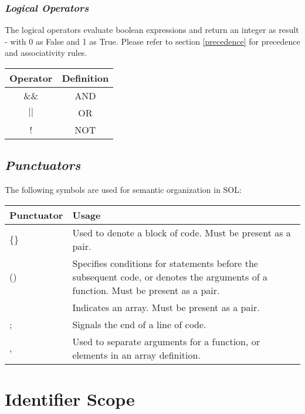 \documentclass[letterpaper,12pt]{article}
\begin{document}
        \subsubsection{\textit{Logical Operators}}
        The logical operators evaluate boolean expressions and return an integer as result - with 0 as False and 1 as True. Please refer to section \ref{precedence} for precedence and associativity rules.
	        \begin{center}
	        	\begin{tabular}{ |c|c| }
	        		\hline
	        		\textbf{Operator} & \textbf{Definition}\\
	        		\hline
	        		\&\&  & AND\\
	        		$||$  & OR\\
	        		!  & NOT\\
	        		\hline
	        	\end{tabular}
	        \end{center}

	\subsection{\textit{Punctuators}}
	The following symbols are used for semantic organization in SOL:
	     \begin{center}
	     	\begin{tabular}{ |p{0.25\hsize}|p{0.75\hsize}| }
	     		\hline
	     		\textbf{Punctuator} & \textbf{Usage} \\
	     		\hline
	     		\{\}			& Used to denote a block of code. Must be present as a pair. \\
	     		()				& Specifies conditions for statements before the subsequent code, or denotes the arguments of a function. Must be present as a pair. \\
	     		\lbrack\rbrack	& Indicates an array. Must be present as a pair. \\
	     		;				& Signals the end of a line of code. \\
	     		,				& Used to separate arguments for a function, or elements in an array definition. \\
	     		\hline
	     	\end{tabular}
	     \end{center}
	
\section{Identifier Scope}
\end{document}
